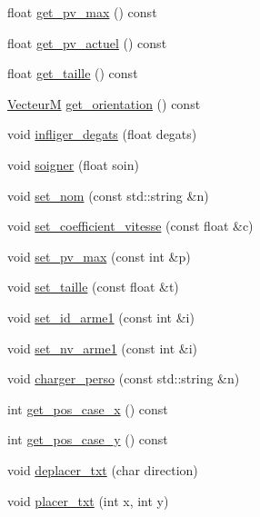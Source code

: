 \begin{DoxyCompactItemize}
\item 
float \hyperlink{classPerso_a5a56b6db9d25cf6c34ebb16d31a0b7a5}{get\+\_\+pv\+\_\+max} () const 
\item 
float \hyperlink{classPerso_aa7ca3080d319f62908c10f777fe93811}{get\+\_\+pv\+\_\+actuel} () const 
\item 
float \hyperlink{classPerso_a37f3623645e49fd9408a350f75eac62f}{get\+\_\+taille} () const 
\item 
\hyperlink{classVecteurM}{VecteurM} \hyperlink{classPerso_a7092b7aef8e99d900db50114d55cab2b}{get\+\_\+orientation} () const 
\item 
void \hyperlink{classPerso_aa090d23e55bbbda0cf572d9cbdb294e6}{infliger\+\_\+degats} (float degats)
\item 
void \hyperlink{classPerso_a26cb7f4235726561a55d6feb585cf789}{soigner} (float soin)
\item 
void \hyperlink{classPerso_a072d564a8bca3b10d03acbffc9dacfea}{set\+\_\+nom} (const std\+::string \&n)
\item 
void \hyperlink{classPerso_aa687e5caeb62f90622ad1a09e4e95380}{set\+\_\+coefficient\+\_\+vitesse} (const float \&c)
\item 
void \hyperlink{classPerso_a197f7c4a5ca9677ebc597a56b64d066c}{set\+\_\+pv\+\_\+max} (const int \&p)
\item 
void \hyperlink{classPerso_aba25d0e7ca796d4b5f05b9a4ff34d239}{set\+\_\+taille} (const float \&t)
\item 
void \hyperlink{classPerso_ac6538c0cccd1f7703fabadf491737a41}{set\+\_\+id\+\_\+arme1} (const int \&i)
\item 
void \hyperlink{classPerso_a4f35ce41db777a555946a52609a48ee3}{set\+\_\+nv\+\_\+arme1} (const int \&i)
\item 
void \hyperlink{classPerso_a12d61850ed6d9e1ce8da1b95a976e5cb}{charger\+\_\+perso} (const std\+::string \&n)
\item 
int \hyperlink{classPerso_a4a277ad575018af259025b8008a66c99}{get\+\_\+pos\+\_\+case\+\_\+x} () const 
\item 
int \hyperlink{classPerso_a7ac28cb2b5131123254d8b5a358a84a0}{get\+\_\+pos\+\_\+case\+\_\+y} () const 
\item 
void \hyperlink{classPerso_a7903c80e4915a2f3a45452360b69b798}{deplacer\+\_\+txt} (char direction)
\item 
void \hyperlink{classPerso_a7ba97b055676c800724ba1f1faf4c517}{placer\+\_\+txt} (int x, int y)
\end{DoxyCompactItemize}


